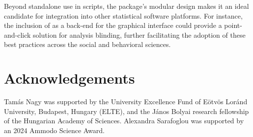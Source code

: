 \documentclass[
]{jss}
\begin{document}
Beyond standalone use in  scripts, the package's modular
design makes it an ideal candidate for integration into other
statistical software platforms. For instance, the inclusion of
 as a back-end for the  \citep{JASP2025}
graphical interface could provide a point-and-click solution for
analysis blinding, further facilitating the adoption of these best
practices across the social and behavioral sciences.

\section{Acknowledgements}\label{acknowledgements}

Tamás Nagy was supported by the University Excellence Fund of Eötvös
Loránd University, Budapest, Hungary (ELTE), and the János Bolyai
research fellowship of the Hungarian Academy of Sciences. Alexandra
Sarafoglou was supported by an 2024 Ammodo Science Award.

\renewcommand\refname{References}

\end{document}
